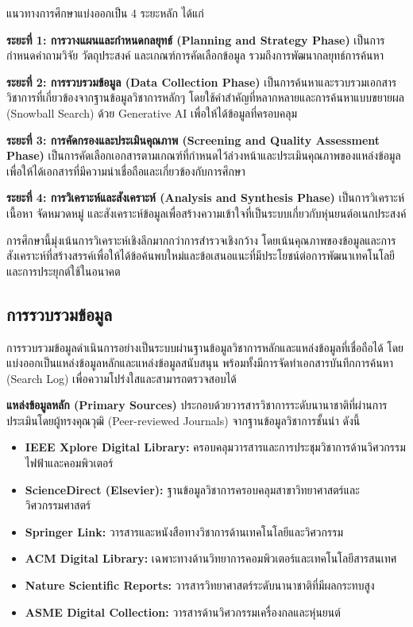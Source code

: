 \documentclass[a4paper]{article}
\begin{document}
แนวทางการศึกษาแบ่งออกเป็น 4 ระยะหลัก ได้แก่

\textbf{ระยะที่ 1: การวางแผนและกำหนดกลยุทธ์ (Planning and Strategy Phase)} เป็นการกำหนดคำถามวิจัย วัตถุประสงค์ และเกณฑ์การคัดเลือกข้อมูล รวมถึงการพัฒนากลยุทธ์การค้นหา

\textbf{ระยะที่ 2: การรวบรวมข้อมูล (Data Collection Phase)} เป็นการค้นหาและรวบรวมเอกสารวิชาการที่เกี่ยวข้องจากฐานข้อมูลวิชาการหลักๆ โดยใช้คำสำคัญที่หลากหลายและการค้นหาแบบขยายผล (Snowball Search) ด้วย Generative AI เพื่อให้ได้ข้อมูลที่ครอบคลุม

\textbf{ระยะที่ 3: การคัดกรองและประเมินคุณภาพ (Screening and Quality Assessment Phase)} เป็นการคัดเลือกเอกสารตามเกณฑ์ที่กำหนดไว้ล่วงหน้าและประเมินคุณภาพของแหล่งข้อมูลเพื่อให้ได้เอกสารที่มีความน่าเชื่อถือและเกี่ยวข้องกับการศึกษา

\textbf{ระยะที่ 4: การวิเคราะห์และสังเคราะห์ (Analysis and Synthesis Phase)} เป็นการวิเคราะห์เนื้อหา จัดหมวดหมู่ และสังเคราะห์ข้อมูลเพื่อสร้างความเข้าใจที่เป็นระบบเกี่ยวกับหุ่นยนต์อเนกประสงค์

การศึกษานี้มุ่งเน้นการวิเคราะห์เชิงลึกมากกว่าการสำรวจเชิงกว้าง โดยเน้นคุณภาพของข้อมูลและการสังเคราะห์ที่สร้างสรรค์เพื่อให้ได้ข้อค้นพบใหม่และข้อเสนอแนะที่มีประโยชน์ต่อการพัฒนาเทคโนโลยีและการประยุกต์ใช้ในอนาคต

\subsection{การรวบรวมข้อมูล}

การรวบรวมข้อมูลดำเนินการอย่างเป็นระบบผ่านฐานข้อมูลวิชาการหลักและแหล่งข้อมูลที่เชื่อถือได้ โดยแบ่งออกเป็นแหล่งข้อมูลหลักและแหล่งข้อมูลสนับสนุน พร้อมทั้งมีการจัดทำเอกสารบันทึกการค้นหา (Search Log) เพื่อความโปร่งใสและสามารถตรวจสอบได้

\textbf{แหล่งข้อมูลหลัก (Primary Sources)} ประกอบด้วยวารสารวิชาการระดับนานาชาติที่ผ่านการประเมินโดยผู้ทรงคุณวุฒิ (Peer-reviewed Journals) จากฐานข้อมูลวิชาการชั้นนำ ดังนี้
\begin{itemize}
\item \textbf{IEEE Xplore Digital Library:} ครอบคลุมวารสารและการประชุมวิชาการด้านวิศวกรรมไฟฟ้าและคอมพิวเตอร์
\item \textbf{ScienceDirect (Elsevier):} ฐานข้อมูลวิชาการครอบคลุมสาขาวิทยาศาสตร์และวิศวกรรมศาสตร์
\item \textbf{Springer Link:} วารสารและหนังสือทางวิชาการด้านเทคโนโลยีและวิศวกรรม
\item \textbf{ACM Digital Library:} เฉพาะทางด้านวิทยาการคอมพิวเตอร์และเทคโนโลยีสารสนเทศ
\item \textbf{Nature Scientific Reports:} วารสารวิทยาศาสตร์ระดับนานาชาติที่มีผลกระทบสูง
\item \textbf{ASME Digital Collection:} วารสารด้านวิศวกรรมเครื่องกลและหุ่นยนต์
\end{itemize}
\end{document}
